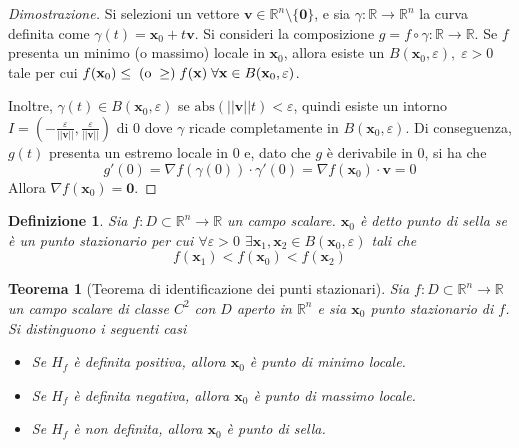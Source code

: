 \documentclass{article}
\newtheorem{theorem}{Teorema}
\newtheorem{definition}{Definizione}
\begin{document}
            \begin{proof}[Dimostrazione]
                Si selezioni un vettore $\mathbf{v} \in \mathbb{R}^{n} \setminus \{\mathbf{0}\}$, e sia $\gamma: \mathbb{R} \rightarrow \mathbb{R}^{n}$ la curva definita come $\gamma(t) = \mathbf{x}_0 + t \mathbf{v}$. 
                Si consideri la composizione $g = f \circ \gamma: \mathbb{R} \rightarrow \mathbb{R}$.
                Se $f$ presenta un minimo (o massimo) locale in $\mathbf{x}_0$, allora esiste un $B(\mathbf{x}_0, \varepsilon), \; \varepsilon > 0$ tale per cui $f(\mathbf{x}_0) \leq \; (\textnormal{o} \;\geq) \; f(\mathbf{x}) \; \forall \mathbf{x} \in B(\mathbf{x}_0, \varepsilon)$.
                
                \vspace{5pt}
                Inoltre, $\gamma(t) \in B(\mathbf{x}_0, \varepsilon)$ se $\text{abs}(||\mathbf{v}||t) < \varepsilon$, quindi esiste un intorno $I = \displaystyle (-\frac{\varepsilon}{||\mathbf{v}||}, \frac{\varepsilon}{||\mathbf{v}||})$ di $0$ dove $\gamma$ ricade completamente in 
                $B(\mathbf{x}_0, \varepsilon)$. Di conseguenza, $g(t)$ presenta un estremo locale in $0$ e, dato che $g$ è derivabile in $0$, si ha che
                \[
                    g'(0) = \nabla f(\gamma(0)) \cdot \gamma'(0) = \nabla f(\mathbf{x}_0) \cdot \mathbf{v} = 0
                \]
                Allora $\nabla f(\mathbf{x}_0) = \mathbf{0}$.
            \end{proof}
            
            \begin{definition}
                Sia $f: D \subset \mathbb{R}^{n} \rightarrow \mathbb{R}$ un campo scalare. $\mathbf{x}_0$ è detto punto di sella se è un punto stazionario per cui $\forall \varepsilon > 0$ $\exists \mathbf{x}_1, \mathbf{x}_2 \in B(\mathbf{x}_0, \varepsilon)$ tali che 
                \[
                    f(\mathbf{x}_1) < f(\mathbf{x}_0) < f(\mathbf{x}_2)
                \]
            \end{definition}

            \begin{theorem}[Teorema di identificazione dei punti stazionari]
                Sia $f: D \subset \mathbb{R}^{n} \rightarrow \mathbb{R}$ un campo scalare di classe $C^2$ con $D$ aperto in $\mathbb{R}^{n}$ e sia $\mathbf{x}_0$ punto stazionario di $f$. Si distinguono i seguenti casi
                \begin{itemize}
                    \item Se $H_{f}$ è definita positiva, allora $\mathbf{x}_0$ è punto di minimo locale.
                    \item Se $H_{f}$ è definita negativa, allora $\mathbf{x}_0$ è punto di massimo locale.
                    \item Se $H_{f}$ è non definita, allora $\mathbf{x}_0$ è punto di sella.
                \end{itemize}
            \end{theorem}
\end{document}
